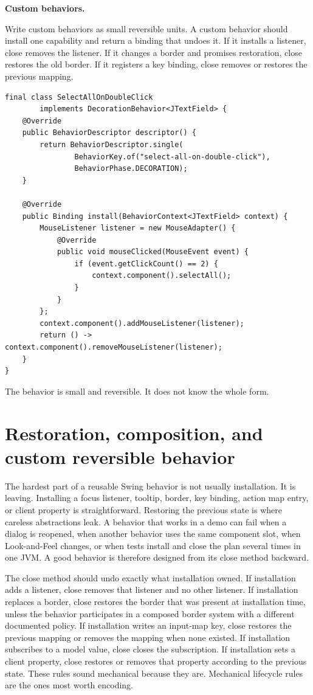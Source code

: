 \textbf{Custom behaviors.}

Write custom behaviors as small reversible units. A custom behavior should
install one capability and return a binding that undoes it. If it installs a
listener, close removes the listener. If it changes a border and promises
restoration, close restores the old border. If it registers a key binding, close
removes or restores the previous mapping.

\begin{lstlisting}[caption={Custom behavior shape.}]
final class SelectAllOnDoubleClick
        implements DecorationBehavior<JTextField> {
    @Override
    public BehaviorDescriptor descriptor() {
        return BehaviorDescriptor.single(
                BehaviorKey.of("select-all-on-double-click"),
                BehaviorPhase.DECORATION);
    }

    @Override
    public Binding install(BehaviorContext<JTextField> context) {
        MouseListener listener = new MouseAdapter() {
            @Override
            public void mouseClicked(MouseEvent event) {
                if (event.getClickCount() == 2) {
                    context.component().selectAll();
                }
            }
        };
        context.component().addMouseListener(listener);
        return () -> context.component().removeMouseListener(listener);
    }
}
\end{lstlisting}

The behavior is small and reversible. It does not know the whole form.

\section{Restoration, composition, and custom reversible behavior}

The hardest part of a reusable Swing behavior is not usually installation. It
is leaving. Installing a focus listener, tooltip, border, key binding, action
map entry, or client property is straightforward. Restoring the previous state
is where careless abstractions leak. A behavior that works in a demo can fail
when a dialog is reopened, when another behavior uses the same component slot,
when Look-and-Feel changes, or when tests install and close the plan several
times in one JVM. A good behavior is therefore designed from its close method
backward.

The close method should undo exactly what installation owned. If installation
adds a listener, close removes that listener and no other listener. If
installation replaces a border, close restores the border that was present at
installation time, unless the behavior participates in a composed border system
with a different documented policy. If installation writes an input-map key,
close restores the previous mapping or removes the mapping when none existed.
If installation subscribes to a model value, close closes the subscription. If
installation sets a client property, close restores or removes that property
according to the previous state. These rules sound mechanical because they are.
Mechanical lifecycle rules are the ones most worth encoding.

